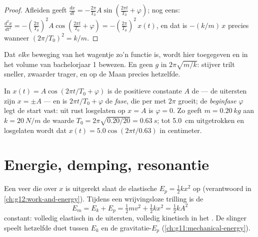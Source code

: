 \begin{proof}
Afleiden geeft $\frac{dx}{dt} = -\frac{2\pi}{T_0}A \sin(\frac{2\pi
t}{T_0} + \varphi)$; nog eens: $\frac{d^2x}{dt^2} = -(\frac{2\pi}{T_0})^2
A\cos(\frac{2\pi t}{T_0} + \varphi) = -(\frac{2\pi}{T_0})^2\,x(t)$, en dat is
$-(k/m)\,x$ precies wanneer $(2\pi/T_0)^2 = k/m$.
\end{proof}

\begin{remark}\label{rem:g12:oscillators-and-time:uniqueness}
Dat \emph{elke} beweging van het wagentje zo'n functie is, wordt hier
toegegeven en in het volume van bachelorjaar 1 bewezen. En geen $g$ in
$2\pi\sqrt{m/k}$: stijver trilt sneller, zwaarder trager, en op de Maan
precies hetzelfde.
\end{remark}

\begin{definition}\label{def:g12:oscillators-and-time:phase}
In $x(t) = A\cos(2\pi t/T_0 + \varphi)$ is de positieve constante $A$ de
 --- de uitersten zijn $x = \pm A$ --- en is $2\pi t/T_0 + \varphi$
de \emph{fase}, die per  met $2\pi$ groeit; de
\emph{beginfase} $\varphi$ legt de start vast: uit rust
losgelaten op $x = A$ is $\varphi = 0$. Zo geeft $m = \qty{0.20}{kg}$ aan
$k = \qty{20}{N/m}$ de waarde $T_0 = 2\pi\sqrt{0.20/20} = \qty{0.63}{s}$; tot
\qty{5.0}{cm} uitgetrokken en losgelaten wordt dat $x(t) = 5.0\cos(2\pi
t/0.63)$ in centimeter.
\end{definition}

\section{Energie, demping, resonantie}

\begin{proposition}\label{prop:g12:oscillators-and-time:energy}
Een veer die over $x$ is uitgerekt slaat de elastische 
$E_p = \tfrac12 kx^2$ op (verantwoord in \cref{ch:g12:work-and-energy}).
Tijdens een wrijvingsloze trilling is de 
\[
E_m = E_k + E_p = \tfrac12 m v^2 + \tfrac12 k x^2 = \tfrac12 k A^2
\]
constant: volledig elastisch in de uitersten, volledig kinetisch in het
. De slinger speelt hetzelfde duet tussen $E_k$ en de
gravitatie-$E_p$ (\cref{ch:g11:mechanical-energy}).
\end{proposition}

